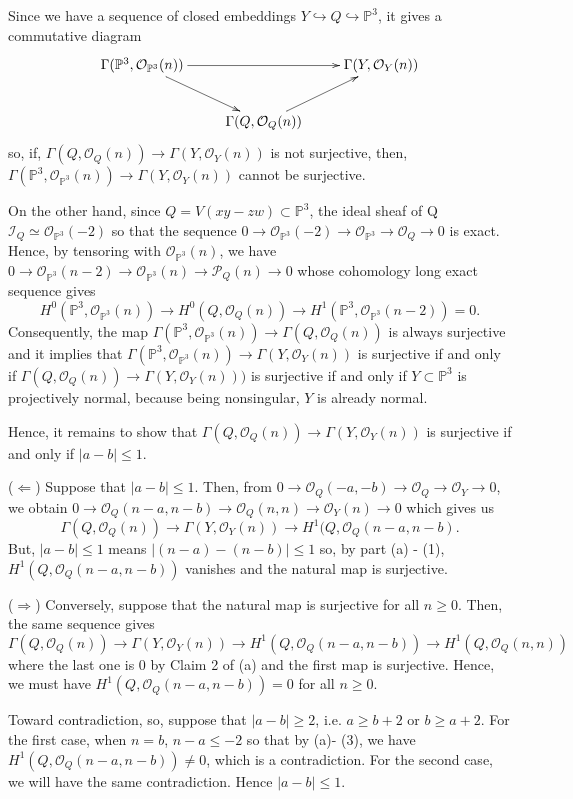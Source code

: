 \documentclass[11pt]{amsart}          %
\newcommand{\calO}{\mathcal{O}}
\newcommand{\calI}{\mathcal{I}}
\newcommand{\calP}{\mathcal{P}}
\newcommand{\bbP}{\mathbb{P}}
\begin{document}
\begin{enumerate}
\begin{enumerate}
	Since we have a sequence of closed embeddings $Y \hookrightarrow Q \hookrightarrow \bbP^3$, it gives a commutative diagram
	$$\xymatrix{ \Gamma( \bbP^3, \calO_{\bbP^3} (n)) \ar[dr] \ar[rr] & & \Gamma(Y, \calO_Y (n)) \\ & \Gamma (Q, \calO_Q (n)) \ar[ru] & }$$ so, if, $\Gamma (Q, \calO_Q(n)) \to \Gamma(Y, \calO_Y (n))$ is not surjective, then, $\Gamma(\bbP^3, \calO_{\bbP^3}(n)) \to \Gamma(Y, \calO_Y (n))$ cannot be surjective.
	
	On the other hand, since $Q = V(xy- zw) \subset \bbP^3$, the ideal sheaf of Q $\calI_Q \simeq \calO_{\bbP^3} (-2)$ so that the sequence $0 \to \calO_{\bbP^3} (-2) \to \calO_{\bbP^3} \to \calO_Q \to 0$ is exact. Hence, by tensoring with $\calO_{\bbP^3} (n)$, we have $0 \to \calO_{\bbP^3} (n-2) \to \calO_{\bbP^3} (n) \to \calP_Q (n) \to 0$ whose cohomology long exact sequence gives
	$$H^0 (\bbP^3, \calO_{\bbP^3} (n)) \to H^0 (Q, \calO_Q (n)) \to H^1 (\bbP^3, \calO_{\bbP^3} (n-2)) = 0.$$ Consequently, the map $\Gamma (\bbP^3, \calO_{\bbP^3} (n)) \to \Gamma (Q, \calO_Q (n))$ is always surjective and it implies that $\Gamma (\bbP^3, \calO_{\bbP^3}(n)) \to \Gamma(Y, \calO_Y (n))$ is surjective if and only if $\Gamma (Q, \calO_Q (n)) \to \Gamma (Y, \calO_Y (n)))$ is surjective if and only if $Y \subset \bbP^3$ is projectively normal, because being nonsingular, $Y$ is already normal.
	
	Hence, it remains to show that $\Gamma (Q, \calO_Q (n)) \to \Gamma (Y, \calO_Y (n))$ is surjective if and only if $|a-b|\leq 1$.
	
	($\Leftarrow$) Suppose that $|a-b|\leq 1$. Then, from $0 \to \calO_Q (-a, -b) \to \calO_Q \to \calO_Y \to 0$, we obtain $0 \to \calO_Q (n-a, n-b) \to \calO_Q (n,n) \to \calO_Y (n) \to 0$ which gives us
	$$\Gamma (Q, \calO_Q (n)) \to \Gamma (Y, \calO_Y (n)) \to H^1(Q, \calO_Q (n-a, n-b).$$ But, $|a-b | \leq 1$ means $|(n-a) - (n-b) |\leq 1$ so, by part (a) - (1), $H^1 (Q, \calO_Q (n-a, n-b))$ vanishes and the natural map is surjective.
	
	($\Rightarrow$) Conversely, suppose that the natural map is surjective for all $n \geq 0$. Then, the same sequence gives
	$$\Gamma (Q, \calO_Q(n)) \to \Gamma(Y, \calO_Y (n)) \to H^1(Q, \calO_Q (n-a, n-b)) \to H^1(Q, \calO_Q (n,n))$$ where the last one is $0$ by Claim 2 of (a) and the first map is surjective. Hence, we must have $H^1(Q, \calO_Q (n-a, n-b) ) = 0$ for all $n \geq 0$.
	
	Toward contradiction, so, suppose that $|a-b | \geq 2$, i.e. $a \geq b+2$ or $b \geq a + 2$. For the first case, when $n = b$, $n-a \leq -2$ so that by (a)- (3), we have $H^1 (Q, \calO_Q (n-a, n-b)) \not = 0$, which is a contradiction. For the second case, we will have the same contradiction. Hence $|a-b | \leq 1$.
	

\end{enumerate}
\end{enumerate}
\end{document}
